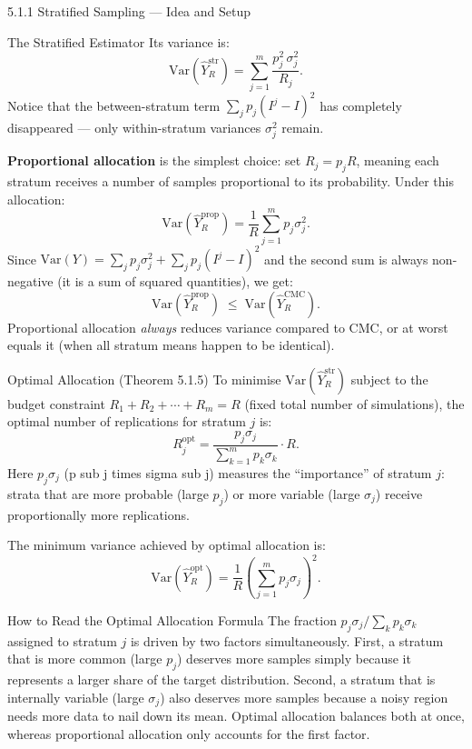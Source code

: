 \documentclass[aspectratio=169,10pt]{beamer}
\begin{document}
\begin{frame}[allowframebreaks]{5.1.1 Stratified Sampling --- Idea and Setup}
\begin{block}{The Stratified Estimator}
  Its variance is:
  \[
    \mathrm{Var}(\hat{Y}_R^{\mathrm{str}}) = \sum_{j=1}^m \frac{p_j^2 \,\sigma_j^2}{R_j}.
  \]
  Notice that the between-stratum term $\sum_j p_j(I^j-I)^2$ has completely
  disappeared --- only within-stratum variances $\sigma_j^2$ remain.
\end{block}

\framebreak

\textbf{Proportional allocation} is the simplest choice: set $R_j = p_j R$,
meaning each stratum receives a number of samples proportional to its probability.
Under this allocation:
\[
  \mathrm{Var}(\hat{Y}_R^{\mathrm{prop}}) = \frac{1}{R}\sum_{j=1}^m p_j \sigma_j^2.
\]
Since $\mathrm{Var}(Y) = \sum_j p_j \sigma_j^2 + \sum_j p_j(I^j-I)^2$ and the
second sum is always non-negative (it is a sum of squared quantities), we get:
\[
  \mathrm{Var}(\hat{Y}_R^{\mathrm{prop}}) \;\le\; \mathrm{Var}(\hat{Y}_R^{\mathrm{CMC}}).
\]
Proportional allocation \emph{always} reduces variance compared to CMC, or at
worst equals it (when all stratum means happen to be identical).

\begin{block}{Optimal Allocation (Theorem 5.1.5)}
  To minimise $\mathrm{Var}(\hat{Y}_R^{\mathrm{str}})$ subject to the budget
  constraint $R_1 + R_2 + \cdots + R_m = R$ (fixed total number of simulations),
  the optimal number of replications for stratum $j$ is:
  \[
    R_j^{\mathrm{opt}} = \frac{p_j \sigma_j}{\displaystyle\sum_{k=1}^m p_k \sigma_k}\cdot R.
  \]
  Here $p_j \sigma_j$ (p sub j times sigma sub j) measures the ``importance'' of
  stratum $j$: strata that are more probable (large $p_j$) or more variable
  (large $\sigma_j$) receive proportionally more replications.

  The minimum variance achieved by optimal allocation is:
  \[
    \mathrm{Var}(\hat{Y}_R^{\mathrm{opt}}) = \frac{1}{R}\!\left(\sum_{j=1}^m p_j \sigma_j\right)^{\!2}.
  \]
\end{block}

\framebreak

\begin{alertblock}{How to Read the Optimal Allocation Formula}
  The fraction $p_j \sigma_j / \sum_k p_k \sigma_k$ assigned to stratum $j$
  is driven by two factors simultaneously.
  First, a stratum that is more common (large $p_j$) deserves more samples
  simply because it represents a larger share of the target distribution.
  Second, a stratum that is internally variable (large $\sigma_j$) also
  deserves more samples because a noisy region needs more data to nail down
  its mean.
  Optimal allocation balances both at once, whereas proportional allocation
  only accounts for the first factor.
\end{alertblock}


\end{frame}
\end{document}
